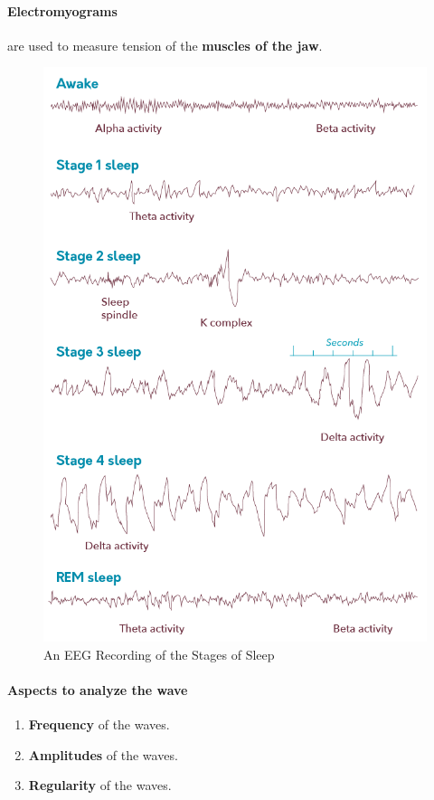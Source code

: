 \documentclass{article}
\begin{document}
	\paragraph{Electromyograms} are used to measure tension of the \textbf{muscles of the jaw}.
	\begin{figure}
		\centering
		\includegraphics[width=\linewidth]{pic/EEG_stages_of_sleep}
		\caption{An EEG Recording of the Stages of Sleep}
	\end{figure}
	\paragraph{Aspects to analyze the wave}
	\begin{enumerate}
		\item \textbf{Frequency} of the waves.
		\item \textbf{Amplitudes} of the waves.
		\item \textbf{Regularity} of the waves.
	\end{enumerate}
\end{document}
